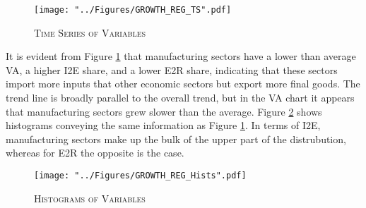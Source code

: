 \documentclass[a4paper]{article}
\begin{document}
\begin{figure}[h!]
\centering
\caption{\label{fig:GROWTH_REG_TS}\textsc{Time Series of Variables}}
\texttt{[image: "../Figures/GROWTH\_REG\_TS".pdf]} %
\end{figure}
\FloatBarrier

It is evident from Figure \ref{fig:GROWTH_REG_TS} that manufacturing sectors have a lower than average VA, a higher I2E share, and a lower E2R share, indicating that these sectors import more inputs that other economic sectors but export more final goods. The trend line is broadly parallel to the overall trend, but in the VA chart it appears that manufacturing sectors grew slower than the average. Figure \ref{fig:GROWTH_REG_Hists} shows histograms conveying the same information as Figure \ref{fig:GROWTH_REG_TS}. %
In terms of I2E, manufacturing sectors make up the bulk of the upper part of the distrubution, whereas for E2R the opposite is the case. %

\begin{figure}[h!]
\centering
\caption{\label{fig:GROWTH_REG_Hists}\textsc{Histograms of Variables}}
\texttt{[image: "../Figures/GROWTH\_REG\_Hists".pdf]} %
\end{figure}
\FloatBarrier
\end{document}
